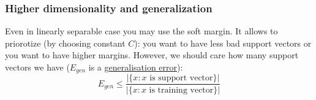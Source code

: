 \subsubsection*{Higher dimensionality and generalization}

Even in linearly separable case you may use the soft margin. It allows to priorotize (by choosing constant $C$): you want to have less bad support vectors or you want to have higher margins. However, we should care how many support vectors we have ($E_{gen}$ is a \hyperlink{gen_error}{generalisation error}):
$$E_{gen}\le\frac{|\{x\colon x \text{ is support vector}\}|}{|\{x\colon x \text{ is training vector}\}|}$$
